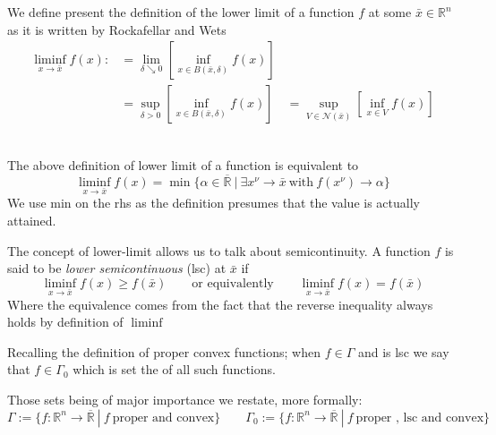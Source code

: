 \begin{definition}
We define present the definition of the lower limit of a function $f$ at some
$\bar x\in\mathbb R^n$ as it is written by Rockafellar and Wets
\autocite{rockafellar2009variational}
\begin{align*}
	\liminf_{x\rightarrow \bar x} f(x) :&= \lim_{\delta \searrow 0}
	\left[\inf_{x\in B(\bar x,\delta)}f(x)\right]\\[2ex]
		&=\sup_{\delta >0}\left[\inf_{x\in B(\bar x,\delta)}f(x)\right]
		\quad = \sup_{V\in \mathcal{N}(\bar x)}\left[\inf_{x\in
		V}f(x)\right]
\end{align*}
\end{definition}
\begin{prop}
	\autocite{rockafellar2009variational}\\
The above definition of lower limit of a function is equivalent to
\begin{equation*}
	\liminf_{x\rightarrow\bar x}f(x) = \min\{\alpha\in\overline{\mathbb R}\ 
		| \ \exists x^{\nu} \rightarrow \bar x \ \text{with}
	\ f(x^{\nu})\rightarrow \alpha\} 
\end{equation*} We use min on the rhs as the definition presumes that the value
is actually attained.
\end{prop}
%
\begin{definition}
The concept of lower-limit allows us to talk about semicontinuity. 
A function $f$ is said to be \emph{lower semicontinuous} (lsc) at $\bar x$  if
\begin{equation*}
	\liminf_{x\rightarrow\bar x}f(x) \geq f(\bar x) 
	\qquad \text{or equivalently} \qquad 
	\liminf_{x\rightarrow\bar x}f(x)=f(\bar x)
\end{equation*}
Where the equivalence comes from the fact that the reverse inequality always
holds by definition of $\liminf$
\end{definition}
%
\clearpage
\begin{definition}
Recalling the definition of proper convex functions; when $f\in\Gamma$ and is
lsc we say that $f\in \Gamma_0$ which is set the of all such functions.
\end{definition} Those sets being of major importance we restate, more
formally:
\begin{equation*}
	\Gamma:= \{f:\mathbb R^n \longrightarrow \mathbb \overline{\mathbb R} \
	| \ f \ \text{proper and convex}\}
	\qquad \Gamma_0 := 
	\{f:\mathbb R^n \longrightarrow \mathbb \overline{\mathbb R} \
	| \ f \ \text{proper , lsc and convex}\}
\end{equation*}
